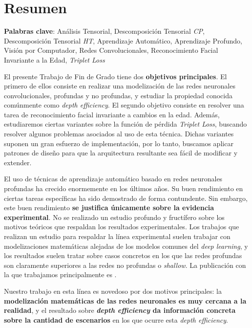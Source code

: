 %



\chapter{Resumen}

\textbf{Palabras clave}: Análisis Tensorial, Descomposición Tensorial \textit{CP}, Descomposición Tensorial \textit{HT}, Aprendizaje Automático, Aprendizaje Profundo, Visión por Computador, Redes Convolucionales, Reconocimiento Facial Invariante a la Edad, \textit{Triplet Loss}

El presente Trabajo de Fin de Grado tiene dos \textbf{objetivos principales}. El primero de ellos consiste en realizar una modelización de las redes neuronales convolucionales, profundas y no profundas, y estudiar la propiedad conocida comúnmente como \textit{depth efficiency}. El segundo objetivo consiste en resolver una tarea de reconocimiento facial invariante a cambios en la edad. Además, estudiaremos ciertas variantes sobre la función de pérdida \textit{Triplet Loss}, buscando resolver algunos problemas asociados al uso de esta técnica. Dichas variantes suponen un gran esfuerzo de implementación, por lo tanto, buscamos aplicar patrones de diseño para que la arquitectura resultante sea fácil de modificar y extender.

El uso de técnicas de aprendizaje automático basado en redes neuronales profundas ha crecido enormemente en los últimos años. Su buen rendimiento en ciertas tareas específicas ha sido demostrado de forma contundente. Sin embargo, este buen rendimiento \textbf{se justifica únicamente sobre la evidencia experimental}. No se realizado un estudio profundo y fructífero sobre los motivos teóricos que respaldan los resultados experimentales. Los trabajos que realizan un estudio para respaldar la línea experimental suelen trabajar con modelizaciones matemáticas alejadas de los modelos comunes del \textit{deep learning}, y los resultados suelen tratar sobre casos concretos en los que las redes profundas son claramente superiores a las redes no profundas o \textit{shallow}. La publicación con la que trabajamos principalmente es \cite{matematicas:principal}.

Nuestro trabajo en esta línea es novedoso por dos motivos principales: la \textbf{modelización matemáticas de las redes neuronales es muy cercana a la realidad}, y el resultado sobre \textbf{\textit{depth efficiency} da información concreta sobre la cantidad de escenarios} en los que ocurre esta \textit{depth efficiency}.

